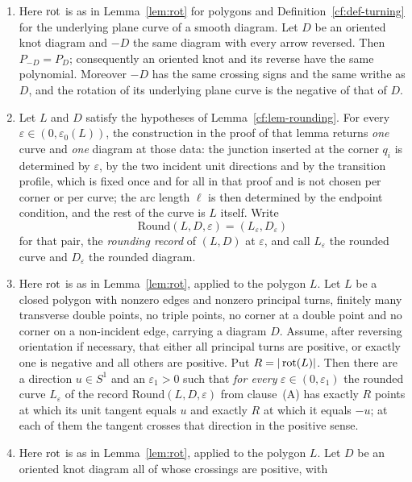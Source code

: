 \begin{theorem}\label{cf:thm-carrierfloor}
\begin{enumerate}
\item[(R)] Here $\operatorname{rot}$ is as in Lemma~\ref{lem:rot} for polygons and
Definition~\ref{cf:def-turning} for the underlying plane curve of a
smooth diagram. Let $D$ be an oriented knot diagram and $-D$ the same
diagram with every arrow reversed. Then $P_{-D}=P_D$; consequently an
oriented knot and its reverse have the same polynomial. Moreover $-D$ has
the same crossing signs and the same writhe as $D$, and the rotation of
its underlying plane curve is the negative of that of $D$.
\item[(A)] Let $L$ and $D$ satisfy the hypotheses of Lemma~\ref{cf:lem-rounding}. For every
$\varepsilon\in(0,\varepsilon_0(L))$, the construction in the proof of that
lemma returns \emph{one} curve and \emph{one} diagram at those data: the
junction inserted at the corner $q_i$ is determined by $\varepsilon$, by the
two incident unit directions and by the transition profile, which is fixed once
and for all in that proof and is not chosen per corner or per curve; the arc
length $\ell$ is then determined by the endpoint condition, and the rest of the
curve is $L$ itself. Write
\[
   \mathrm{Round}(L,D,\varepsilon)=(L_\varepsilon,D_\varepsilon)
\]
for that pair, the \emph{rounding record} of $(L,D)$ at $\varepsilon$, and call
$L_\varepsilon$ the rounded curve and $D_\varepsilon$ the rounded diagram.
\item[(B)] Here $\operatorname{rot}$ is as in Lemma~\ref{lem:rot}, applied to the polygon $L$.
Let $L$ be a closed polygon with nonzero edges and nonzero principal
turns, finitely many transverse double points, no triple points, no corner
at a double point and no corner on a non-incident edge, carrying a diagram
$D$. Assume, after reversing orientation if necessary, that either all
principal turns are positive, or exactly one is negative and all others
are positive. Put $R=|\operatorname{rot}(L)|$. Then
there are a direction $u\in S^1$ and an $\varepsilon_1>0$ such that \emph{for
every} $\varepsilon\in(0,\varepsilon_1)$ the rounded curve $L_\varepsilon$ of
the record $\mathrm{Round}(L,D,\varepsilon)$
from clause~(A) has exactly $R$ points at which its unit
tangent equals $u$ and exactly $R$ at which it equals $-u$; at each of them the
tangent crosses that direction in the positive sense.
\item[(C)] Here $\operatorname{rot}$ is as in Lemma~\ref{lem:rot}, applied to the polygon $L$.
Let $D$ be an oriented knot diagram all of whose crossings are positive, with

\end{enumerate}
\end{theorem}
